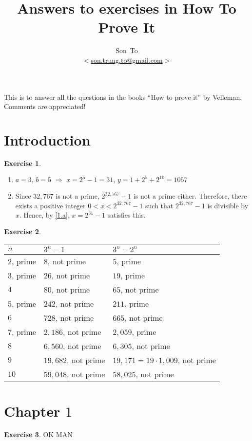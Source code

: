 \documentclass[a4paper,11pt]{article}
\author{Son~To\\
$<$\href{mailto:son.trung.to@gmail.com}{son.trung.to@gmail.com}$>$}
\affil{StaffPoint Oy}
\title{Answers to exercises in How To Prove It}
\theoremstyle{plain} \newtheorem{id}{Lemma}[section]
\theoremstyle{definition} \newtheorem{ex}{Exercise}[section]
\theoremstyle{remark}     \newtheorem{ab}{Remark}[section]
\begin{document}
  \maketitle
  This is to answer all the questions in the books ``How to prove it'' by Velleman.
  Comments are appreciated!

  \clearpage
  \tableofcontents
  \clearpage

  \section{Introduction}
  \begin{ex}
    \begin{enumerate}[label=(\alph*)]
      \item\label{1.a} $a=3$, $b=5$ $\Rightarrow$ $x=2^5-1=31$, $y=1+2^5+2^{10}=1057$
      \item Since $32,767$ is not a prime, $2^{32,767} - 1$ is not a prime either.
      Therefore, there exists a positive integer $0<x<2^{32,767}-1$ such that
      $2^{32,767}-1$ is divisible by $x$. Hence, by \ref{1.a}, $x=2^{31}-1$ satisfies this.
    \end{enumerate}
  \end{ex}

  \begin{ex}
    $ $\newline
    \begin{tabular}{l l l}
      $n$ & $3^n - 1$ & $3^n - 2^n$ \\
      \hline
      $2$, prime & $8$, not prime & $5$, prime \\
      $3$, prime & $26$, not prime & $19$, prime \\
      $4$ & $80$, not prime & $65$, not prime \\
      $5$, prime & $242$, not prime & $211$, prime \\
      $6$ & $728$, not prime & $665$, not prime \\
      $7$, prime & $2,186$, not prime & $2,059$, prime \\
      $8$ & $6,560$, not prime & $6,305$, not prime \\
      $9$ & $19,682$, not prime & $19,171=19\cdot1,009$, not prime \\
      $10$ & $59,048$, not prime & $58,025$, not prime
    \end{tabular}
    
  \end{ex}
  \section{Chapter $1$}
  \begin{ex}
    OK MAN
  \end{ex}
\end{document}
